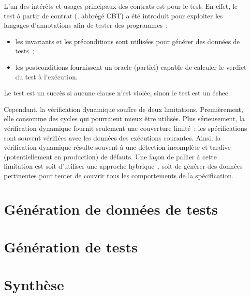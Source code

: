 L'un des intérêts et usages principaux des contrats est pour le test. En effet,
le {\strong test à partir de contrat} (,
abbrégé CBT) a été introduit pour exploiter les langages d'annotations afin de
tester des programmes~:

\begin{itemize}

\item les invariants et les préconditions sont utilisées pour générer des
données de tests~;

\item les postconditions fournissent un oracle (partiel) capable de calculer le
verdict du test à l'exécution.

\end{itemize}

Le test est un {\strong succès} si aucune clause n'est violée, sinon le test est
un {\strong échec}.




Cependant, la vérification dynamique souffre de deux limitations. Premièrement,
elle consomme des cycles qui pourraient mieux être utilisés. Plus sérieusement,
la vérification dynamique fournit seulement une couverture limité~: les
spécifications sont souvent vérifiées avec les données des exécutions courantes.
Ainsi, la vérification dynamique résulte souvent à une détection incomplète et
tardive (potentiellement en production) de défauts. Une façon de pallier à cette
limitation est soit d'utiliser une approche hybrique~, soit de
générer des données pertinentes pour tenter de couvrir tous les comportements de
la spécification.

\section{Génération de données de tests}

\section{Génération de tests}

\section{Synthèse}

